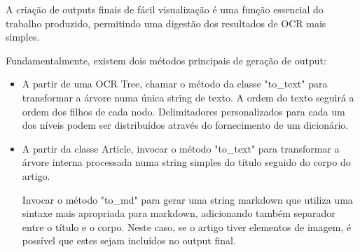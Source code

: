 


A criação de outputs finais de fácil visualização é uma função essencial do trabalho produzido, permitindo uma digestão dos resultados de OCR mais simples.

Fundamentalmente, existem dois métodos principais de geração de output:

\begin{itemize}\setlength\itemsep{-0.3em}
	\item A partir de uma OCR Tree, chamar o método da classe "to\_text" para transformar a árvore numa única string de texto. A ordem do texto seguirá a ordem dos filhos de cada nodo. Delimitadores personalizados para cada um dos níveis podem ser distribuídos através do fornecimento de um dicionário.
	\item A partir da classe Article, invocar o método "to\_text" para transformar a árvore interna processada numa string simples do título seguido do corpo do artigo. 
	
	Invocar o método "to\_md" para gerar uma string markdown que utiliza uma sintaxe mais apropriada para markdown, adicionando também separador entre o título e o corpo. Neste caso, se o artigo tiver elementos de imagem, é possível que estes sejam incluídos no output final.
\end{itemize}






